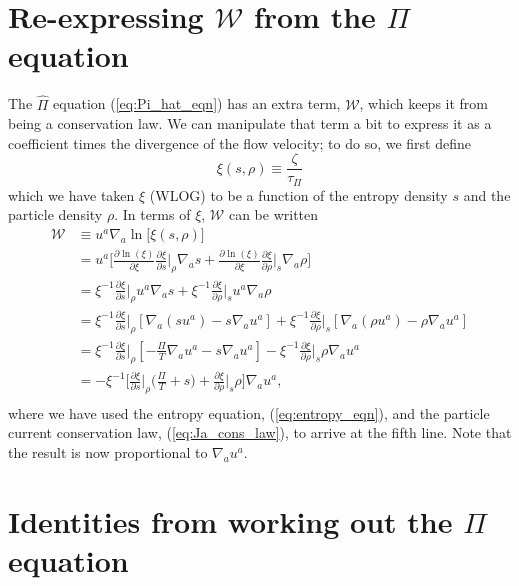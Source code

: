 \documentclass[12pt]{article}
\numberwithin{equation}{section}
\begin{document}
\section{Re-expressing $\mathcal{W}$ from the $\Pi$ equation} \label{sec:W_term}

The $\hat{\Pi}$ equation (\ref{eq:Pi_hat_eqn}) has an extra term, $\mathcal{W}$, which keeps it from being a conservation law.
We can manipulate that term a bit to express it as a coefficient times the divergence of the flow velocity; to do so, we first define
\begin{equation}
\xi(s, \rho) \equiv \frac{\zeta}{\tau_{\Pi}}
\end{equation}
which we have taken $\xi$ (WLOG) to be a function of the entropy density $s$ and the particle density $\rho$.
In terms of $\xi$, $\mathcal{W}$ can be written
\begin{equation}
\begin{aligned}
\mathcal{W} &\equiv u^a \nabla_a \ln \big[ \xi(s, \rho) \big] \\
&= u^a \Big[ \frac{\partial \ln(\xi)}{\partial \xi} \frac{\partial \xi}{\partial s} \Big|_{\rho} \nabla_a s + \frac{\partial \ln(\xi)}{\partial \xi} \frac{\partial \xi}{\partial \rho} \Big|_{s} \nabla_a \rho \Big] \\
&= \xi^{-1} \frac{\partial \xi}{\partial s} \Big|_{\rho} u^a \nabla_a s + \xi^{-1} \frac{\partial \xi}{\partial \rho} \Big|_{s} u^a \nabla_a \rho \\
&= \xi^{-1} \frac{\partial \xi}{\partial s} \Big|_{\rho} [\nabla_a (s u^a) - s \nabla_a u^a] + \xi^{-1} \frac{\partial \xi}{\partial \rho} \Big|_{s} [\nabla_a (\rho u^a) - \rho \nabla_a u^a] \\
&= \xi^{-1} \frac{\partial \xi}{\partial s} \Big|_{\rho} [- \frac{\Pi}{T} \nabla_a u^a - s \nabla_a u^a] - \xi^{-1} \frac{\partial \xi}{\partial \rho} \Big|_{s} \rho \nabla_a u^a \\
&= - \xi^{-1} \Big[ \frac{\partial \xi}{\partial s} \Big|_{\rho} \Big( \frac{\Pi}{T} + s \Big) + \frac{\partial \xi}{\partial \rho} \Big|_{s} \rho \Big] \nabla_a u^a, \\
\end{aligned}
\end{equation}
where we have used the entropy equation, (\ref{eq:entropy_eqn}), and the particle current conservation law, (\ref{eq:Ja_cons_law}), to arrive at the fifth line. 
Note that the result is now proportional to $\nabla_a u^a$.

\section{Identities from working out the $\Pi$ equation}
\end{document}

